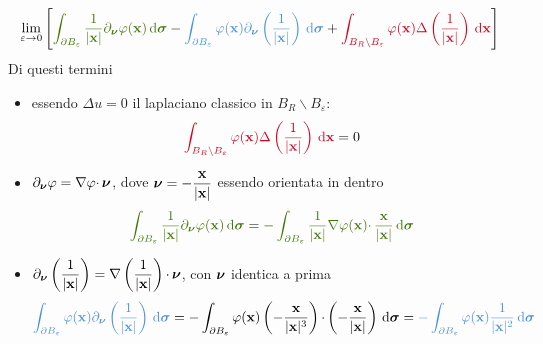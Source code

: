\begin{equation}
    \lim _{\varepsilon \rightarrow 0}\left[\textcolor[rgb]{0.25,0.46,0.02}{\int _{\partial B_{\varepsilon }}\frac{1}{| \x| } \partial _{\nuu} \varphi (\x) \dsig } -\textcolor[rgb]{0.29,0.56,0.89}{\int _{\partial B_{\varepsilon }} \varphi (\x) \partial _{\nuu}\left(\frac{1}{| \x| }\right) \dsig } +\textcolor[rgb]{0.82,0.01,0.11}{\int _{B_{R} \backslash B_{\varepsilon }} \varphi (\x) \Delta \left(\frac{1}{| \x| }\right) \dxx}\right]
    \label{eq:esempio-derivata-limite-2}
\end{equation}
Di questi termini
\begin{itemize}
    \item essendo $\displaystyle \Delta u=0$ il laplaciano classico in $\displaystyle B_{R} \backslash B_{\varepsilon }$:
          \begin{equation*}
              \textcolor[rgb]{0.82,0.01,0.11}{\int _{B_{R} \backslash B_{\varepsilon }} \varphi (\x) \Delta \left(\frac{1}{| \x| }\right) \dxx} =0
          \end{equation*}
    \item  $\displaystyle \partial _{\bm{\nu}} \varphi =\nabla \varphi \cdotp \bm{\nu}$, dove $\displaystyle \bm{\nu} =-\frac{\mathbf{x}}{| \mathbf{x}| }$ essendo orientata in dentro
          \begin{equation*}
              \textcolor[rgb]{0.25,0.46,0.02}{\int _{\partial B_{\varepsilon }}\frac{1}{| \x| } \partial _{\nuu} \varphi (\x) \dsig } =\textcolor[rgb]{0.25,0.46,0.02}{-\int _{\partial B_{\varepsilon }}\frac{1}{| \x| } \nabla \varphi (\x) \cdotp \frac{\x}{| \x| } \dsig }
          \end{equation*}
    \item $\displaystyle \partial _{\bm{\nu}}\left(\frac{1}{| \mathbf{x}| }\right) =\nabla \left(\frac{1}{| \mathbf{x}| }\right) \cdotp \bm{\nu}$, con $\displaystyle \bm{\nu}$ identica a prima
          \begin{equation*}
              \textcolor[rgb]{0.29,0.56,0.89}{\int _{\partial B_{\varepsilon }} \varphi (\x) \partial_{\nuu}\left(\frac{1}{| \x| }\right) \dsig } =-\int _{\partial B_{\varepsilon }} \varphi (\x)\left(-\frac{\x}{| \x| ^{3}}\right) \cdotp \left(-\frac{\x}{| \x| }\right) \dsig =\textcolor[rgb]{0.29,0.56,0.89}{-\int _{\partial B_{\varepsilon }} \varphi (\x)\frac{1}{| \x| ^{2}} \dsig }
          \end{equation*}
\end{itemize}

